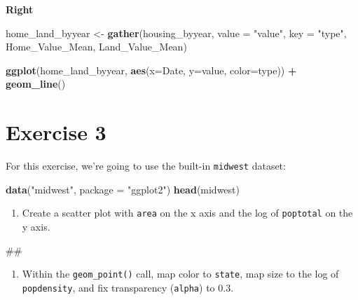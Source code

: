 \documentclass[]{book}
\newenvironment{Shaded}{\begin{snugshade}}{\end{snugshade}}
\newcommand{\KeywordTok}[1]{\textcolor[rgb]{0.13,0.29,0.53}{\textbf{#1}}}
\newcommand{\DataTypeTok}[1]{\textcolor[rgb]{0.13,0.29,0.53}{#1}}
\newcommand{\StringTok}[1]{\textcolor[rgb]{0.31,0.60,0.02}{#1}}
\newcommand{\OperatorTok}[1]{\textcolor[rgb]{0.81,0.36,0.00}{\textbf{#1}}}
\newcommand{\NormalTok}[1]{#1}
\providecommand{\tightlist}{%
  \setlength{\itemsep}{0pt}\setlength{\parskip}{0pt}}
\begin{document}
\textbf{Right}

\begin{Shaded}
\begin{Highlighting}[]
\NormalTok{home_land_byyear <-}\StringTok{ }\KeywordTok{gather}\NormalTok{(housing_byyear,}
                           \DataTypeTok{value =} \StringTok{"value"}\NormalTok{,}
                           \DataTypeTok{key =} \StringTok{"type"}\NormalTok{,}
\NormalTok{                           Home_Value_Mean, Land_Value_Mean)}

\KeywordTok{ggplot}\NormalTok{(home_land_byyear, }\KeywordTok{aes}\NormalTok{(}\DataTypeTok{x=}\NormalTok{Date, }\DataTypeTok{y=}\NormalTok{value, }\DataTypeTok{color=}\NormalTok{type)) }\OperatorTok{+}
\StringTok{  }\KeywordTok{geom_line}\NormalTok{()}
\end{Highlighting}
\end{Shaded}

\section{Exercise 3}\label{exercise-3-2}

For this exercise, we're going to use the built-in \texttt{midwest}
dataset:

\begin{Shaded}
\begin{Highlighting}[]
\KeywordTok{data}\NormalTok{(}\StringTok{"midwest"}\NormalTok{, }\DataTypeTok{package =} \StringTok{"ggplot2"}\NormalTok{)}
\KeywordTok{head}\NormalTok{(midwest)}
\end{Highlighting}
\end{Shaded}

\begin{enumerate}
\def\labelenumi{\arabic{enumi}.}
\tightlist
\item
  Create a scatter plot with \texttt{area} on the x axis and the log of
  \texttt{poptotal} on the y axis.
\end{enumerate}

\begin{Shaded}
\begin{Highlighting}[]
\NormalTok{## }
\end{Highlighting}
\end{Shaded}

\begin{enumerate}
\def\labelenumi{\arabic{enumi}.}
\setcounter{enumi}{1}
\tightlist
\item
  Within the \texttt{geom\_point()} call, map color to \texttt{state},
  map size to the log of \texttt{popdensity}, and fix transparency
  (\texttt{alpha}) to 0.3.
\end{enumerate}
\end{document}
